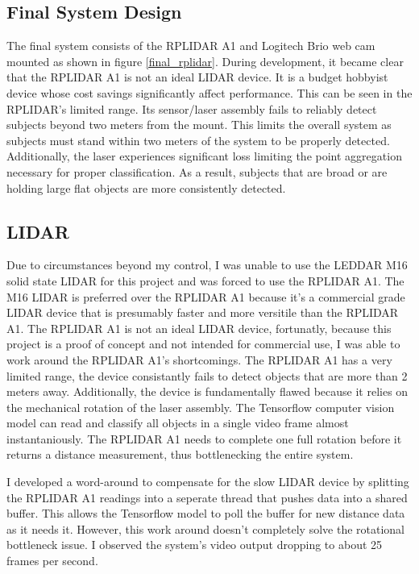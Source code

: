 \documentclass[onecolumn, draftclsnofoot,10pt, compsoc]{IEEEtran}
\begin{document}
\begin{singlespace}
	\section{Final System Design}
		The final system consists of the RPLIDAR A1 and Logitech Brio web cam mounted as shown in figure \ref{final_rplidar}.
		During development, it became clear that the RPLIDAR A1 is not an ideal LIDAR device.
		It is a budget hobbyist device whose cost savings significantly affect performance.
		This can be seen in the RPLIDAR's limited range.
		Its sensor/laser assembly fails to reliably detect subjects beyond two meters from the mount. 
		This limits the overall system as subjects must stand within two meters of the system to be properly detected.
		Additionally, the laser experiences significant loss limiting the point aggregation necessary for proper classification.
		As a result, subjects that are broad or are holding large flat objects are more consistently detected.
		
		\subsection{LIDAR}
		Due to circumstances beyond my control, I was unable to use the LEDDAR M16 solid state LIDAR for this project and was forced to use the RPLIDAR A1. 
		The M16 LIDAR is preferred over the RPLIDAR A1 because it's a commercial grade LIDAR device that is presumably faster and more versitile than the RPLIDAR A1.
		The RPLIDAR A1 is not an ideal LIDAR device, fortunatly, because this project is a proof of concept and not intended for commercial use, I was able to work around the RPLIDAR A1's shortcomings.
		The RPLIDAR A1 has a very limited range, the device consistantly fails to detect objects that are more than 2 meters away.
		Additionally, the device is fundamentally flawed because it relies on the mechanical rotation of the laser assembly. 
		The Tensorflow computer vision model can read and classify all objects in a single video frame almost instantaniously. 
		The RPLIDAR A1 needs to complete one full rotation before it returns a distance measurement, thus bottlenecking the entire system.


		I developed a word-around to compensate for the slow LIDAR device by splitting the RPLIDAR A1 readings into a seperate thread that pushes data into a shared buffer.
		This allows the Tensorflow model to poll the buffer for new distance data as it needs it.
		However, this work around doesn't completely solve the rotational bottleneck issue. 
		I observed the system's video output dropping to about 25 frames per second.



\end{singlespace}
\end{document}
